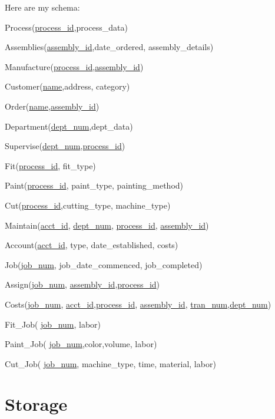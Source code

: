 \documentclass[11pt]{article}
\begin{document}
\indent Here are my schema:

Process(\underline{process\_id},process\_data)

Assemblies(\underline{assembly\_id},date\_ordered, assembly\_details)

Manufacture(\underline{process\_id},\underline{assembly\_id})

Customer(\underline{name},address, category)

Order(\underline{name},\underline{assembly\_id})

Department(\underline{dept\_num},dept\_data)

Supervise(\underline{dept\_num},\underline{process\_id})

Fit(\underline{process\_id}, fit\_type)

Paint(\underline{process\_id}, paint\_type, painting\_method)

Cut(\underline{process\_id},cutting\_type, machine\_type)

Maintain(\underline{acct\_id}, \underline{dept\_num}, \underline{process\_id}, \underline{assembly\_id})

Account(\underline{acct\_id}, type, date\_established, costs)

Job(\underline{job\_num}, job\_date\_commenced, job\_completed)

Assign(\underline{job\_num}, \underline{assembly\_id},\underline{process\_id})

Costs(\underline{job\_num}, \underline{acct\_id},\underline{process\_id}, \underline{assembly\_id}, \underline{tran\_num},\underline{dept\_num})

Fit\_Job( \underline{job\_num}, labor)

Paint\_Job( \underline{job\_num},color,volume, labor)

Cut\_Job( \underline{job\_num}, machine\_type, time, material, labor)

\newpage
\section{Storage}
\end{document}
